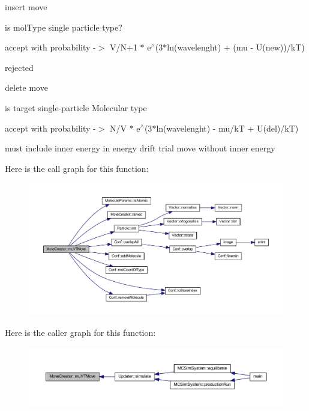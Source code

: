 insert move

is mol\+Type single particle type?

accept with probability -\/$>$ V/\+N+1 $\ast$ e$^\wedge$(3$\ast$ln(wavelenght) + (mu -\/ U(new))/k\+T)

rejected

delete move

is target single-\/particle Molecular type

accept with probability -\/$>$ N/\+V $\ast$ e$^\wedge$(3$\ast$ln(wavelenght) -\/ mu/k\+T + U(del)/k\+T)

must include inner energy in energy drift trial move without inner energy 

Here is the call graph for this function\+:
\nopagebreak
\begin{figure}[H]
\begin{center}
\leavevmode
\includegraphics[width=350pt]{class_move_creator_a2043489b2a8e9f19e3f00373df9dfece_cgraph}
\end{center}
\end{figure}




Here is the caller graph for this function\+:\nopagebreak
\begin{figure}[H]
\begin{center}
\leavevmode
\includegraphics[width=350pt]{class_move_creator_a2043489b2a8e9f19e3f00373df9dfece_icgraph}
\end{center}
\end{figure}


